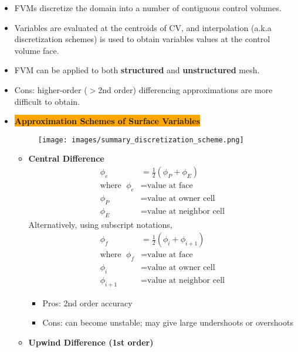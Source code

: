 \begin{itemize}
    \item FVMs discretize the domain into a number of contiguous control volumes.
    \item Variables are evaluated at the centroids of CV, and interpolation (a.k.a discretization schemes) is used to obtain variables values at the control volume face. 
    \item FVM can be applied to both \textbf{\color{red}structured} and \textbf{\color{red}unstructured} mesh.
    \item Cons: higher-order ($>$2nd order) differencing approximations are more difficult to obtain.
    \item \colorbox{orange}{\textbf{\color{white}Approximation Schemes of Surface Variables}}
    \begin{figure}[H]
        \centering
        \texttt{[image: images/summary\_discretization\_scheme.png]}
    \end{figure}
    \begin{itemize}
        \item \textbf{\color{red}Central Difference}
        \begin{align*}
            \phi_e &= \frac{1}{2} (\phi_P + \phi_E) \\
            \text{where }\; \phi_e &= \text{value at face}\\
            \phi_P &= \text{value at owner cell} \\
            \phi_E &= \text{value at neighbor cell}
        \end{align*} 
        Alternatively, using subscript notations,
        \begin{align*}
            \phi_f &= \frac{1}{2} (\phi_i + \phi_{i+1}) \\
            \text{where }\; \phi_f &= \text{value at face}\\
            \phi_i &= \text{value at owner cell} \\
            \phi_{i+1} &= \text{value at neighbor cell}
        \end{align*} 
        \begin{itemize}
            \item Pros: 2nd order accuracy
            \item Cons: can become unstable; may give large undershoots or overshoots
        \end{itemize}
        \item \textbf{\color{red}Upwind Difference (1st order)}

\end{itemize}
\end{itemize}
